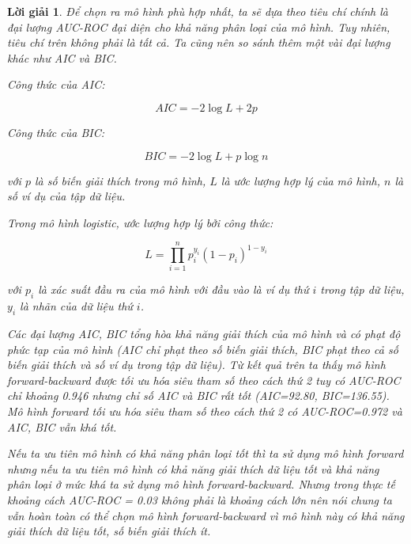 \documentclass[14pt, a4paper]{article}
\theoremstyle{sltheorem}
\theoremstyle{soltheorem}
\newtheorem*{loigiai}{Lời giải}
\begin{document}
\begin{loigiai}
    Để chọn ra mô hình phù hợp nhất, ta sẽ dựa theo tiêu chí chính là đại lượng AUC-ROC đại diện cho khả năng phân loại của mô hình.
    Tuy nhiên, tiêu chí trên không phải là tất cả.
    Ta cũng nên so sánh thêm một vài đại lượng khác như AIC và BIC.

    Công thức của AIC:

    \begin{equation*}
        AIC = - 2 \log L + 2 p
    \end{equation*}

    Công thức của BIC:

    \begin{equation*}
        BIC = -2 \log L + p\log n
    \end{equation*}

    với $p$ là số biến giải thích trong mô hình, $L$ là ước lượng hợp lý của mô hình, $n$ là số ví dụ của tập dữ liệu.

    Trong mô hình logistic, ước lượng hợp lý bởi công thức:

    \begin{equation*}
        L = \prod_{i=1}^n p_i^{y_i}(1-p_i)^{1 - y_i}
    \end{equation*}

    với $p_i$ là xác suất đầu ra của mô hình với đầu vào là ví dụ thứ $i$ trong tập dữ liệu, $y_i$ là nhãn của dữ liệu thứ $i$.

    Các đại lượng AIC, BIC tổng hòa khả năng giải thích của mô hình và có phạt độ phức tạp của mô hình (AIC chỉ phạt theo số biến giải thích, BIC phạt theo cả số biến giải thích và số ví dụ trong tập dữ liệu).
    Từ kết quả trên ta thấy mô hình forward-backward được tối ưu hóa siêu tham số theo cách thứ 2 tuy có AUC-ROC chỉ khoảng 0.946 nhưng chỉ số AIC và BIC rất tốt (AIC=92.80, BIC=136.55).
    Mô hình forward tối ưu hóa siêu tham số theo cách thứ 2 có AUC-ROC=0.972 và AIC, BIC vẫn khá tốt.

    Nếu ta ưu tiên mô hình có khả năng phân loại tốt thì ta sử dụng mô hình forward nhưng nếu ta ưu tiên mô hình có khả năng giải thích dữ liệu tốt và khả năng phân loại ở mức khá ta sử dụng mô hình forward-backward.
    Nhưng trong thực tế khoảng cách AUC-ROC = 0.03 không phải là khoảng cách lớn nên nói chung ta vẫn hoàn toàn có thể chọn mô hình forward-backward vì mô hình này có khả năng giải thích dữ liệu tốt, số biến giải thích ít.
\end{loigiai}

\newpage
\printbibliography[title={TÀI LIỆU THAM KHẢO}]
\end{document}
